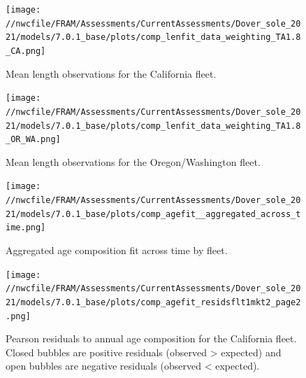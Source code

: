 \documentclass[11pt,
  english,
  a4paper,
]{article}
\begin{document}
\tagmcend\tagstructend


\begin{figure}
\centering
\texttt{[image: //nwcfile/FRAM/Assessments/CurrentAssessments/Dover\_sole\_2021/models/7.0.1\_base/plots/comp\_lenfit\_data\_weighting\_TA1.8\_CA.png]}
\caption{Mean length observations for the California fleet.\label{fig:ca-mean-len}}
\end{figure}

\tagmcend\tagstructend


\begin{figure}
\centering
\texttt{[image: //nwcfile/FRAM/Assessments/CurrentAssessments/Dover\_sole\_2021/models/7.0.1\_base/plots/comp\_lenfit\_data\_weighting\_TA1.8\_OR\_WA.png]}
\caption{Mean length observations for the Oregon/Washington fleet.\label{fig:orwa-mean-len}}
\end{figure}

\tagmcend\tagstructend


\begin{figure}
\centering
\texttt{[image: //nwcfile/FRAM/Assessments/CurrentAssessments/Dover\_sole\_2021/models/7.0.1\_base/plots/comp\_agefit\_\_aggregated\_across\_time.png]}
\caption{Aggregated age composition fit across time by fleet.\label{fig:agg-age-fits}}
\end{figure}

\tagmcend\tagstructend


\begin{figure}
\centering
\texttt{[image: //nwcfile/FRAM/Assessments/CurrentAssessments/Dover\_sole\_2021/models/7.0.1\_base/plots/comp\_agefit\_residsflt1mkt2\_page2.png]}
\caption{Pearson residuals to annual age composition for the California fleet. Closed bubbles are positive residuals (observed \textgreater{} expected) and open bubbles are negative residuals (observed \textless{} expected).\label{fig:ca-pearson-age}}
\end{figure}
\end{document}

